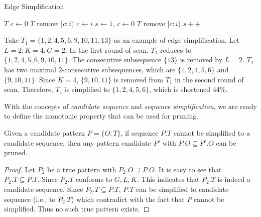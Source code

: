 \begin{algorithm}
\caption{Edge Simplification}
\label{algo:simp_prune}
\begin{algorithmic}[1]
\Require $T$
\State $c \gets 0$
			\State $T$ remove $[c:i)$
		\EndIf
		\State $c \gets i$
	\EndIf
\EndFor
{}
\State $s\gets 1$, $c\gets 0$
			\State $T$ remove $[c:i)$
		\EndIf
	\Else
		\State $s++$
	\EndIf
\EndFor
\end{algorithmic}
\end{algorithm}

\begin{example}
Take $T_1=\{1,2,4,5,6,9,10,11,13\}$ as an example of edge simplification. Let $L = 2, K = 4, G = 2$.
In the first round of scan. $T_1$ reduces to $\{1,2,4,5,6,9,10,11\}$. The consecutive subsequence $\{13\}$
is removed by $L=2$. $T_1$ has two maximal $2$-consecutive subsequences, which 
are $\{1,2,4,5,6\}$ and $\{9,10,11\}$. Since $K=4$, $\{9,10,11\}$ is removed
from $T_1$ in the second round of scan. Therefore, $T_1$ is simplified to $\{1,2,4,5,6\}$, which is shortened $44\%$.
\end{example}


With the concepts of \textit{candidate sequence} and \textit{sequence simplification}, we are ready to define the monotonic property that can be used for pruning.
\begin{theorem}\label{THM:SPM_TM}
Given a candidate pattern $P=\{O:T\}$, if sequence $P.T$ cannot be simplified to a candidate sequence, then any pattern candidate $P'$ with $P.O \subseteq P'.O$ can be pruned.
\end{theorem}

\begin{proof}
Let $P_2$ be a true pattern with $P_2.O \supseteq P.O$. It is easy to see that $P_2.T \subseteq P.T$. Since $P_2.T$ conforms to $G,L,K$. This indicates that $P_2.T$ is indeed a candidate sequence. Since $P_2.T \subseteq P.T$, $P.T$ can be simplified to candidate sequence (i.e., to $P_2.T$) which contradict with the fact that $P$ cannot be simplified. Thus no such true pattern exists.
\end{proof}













